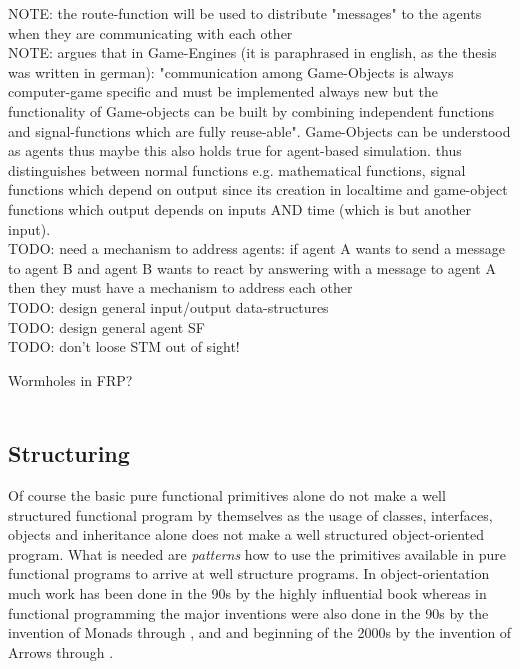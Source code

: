 NOTE: the route-function will be used to distribute "messages" to the agents when they are communicating with each other \\

NOTE: \cite{Meisinger2010} argues that in Game-Engines (it is paraphrased in english, as the thesis was written in german): "communication among Game-Objects is always computer-game specific and must be implemented always new but the functionality of Game-objects can be built by combining independent functions and signal-functions which are fully reuse-able". Game-Objects can be understood as agents thus maybe this also holds true for agent-based simulation. \cite{Meisinger2010} thus distinguishes between normal functions e.g. mathematical functions, signal functions which depend on output since its creation in localtime and game-object functions which output depends on inputs AND time (which is but another input). \\

TODO: need a mechanism to address agents: if agent A wants to send a message to agent B and agent B wants to react by answering with a message to agent A then they must have a mechanism to address each other \\

TODO: design general input/output data-structures \\

TODO: design general agent SF \\

TODO: don't loose STM out of sight!

Wormholes in FRP? \\
\\

\subsection{Structuring}
Of course the basic pure functional primitives alone do not make a well structured functional program by themselves as the usage of classes, interfaces, objects and inheritance alone does not make a well structured object-oriented program. What is needed are \textit{patterns} how to use the primitives available in pure functional programs to arrive at well structure programs. In object-orientation much work has been done in the 90s by the highly influential book \cite{gamma_design_1994} whereas in functional programming the major inventions were also done in the 90s by the invention of Monads through \cite{Moggi1989}, \cite{Wadler1990} and \cite{Wadler1995} and beginning of the 2000s by the invention of Arrows through \cite{Hughes2000}.


